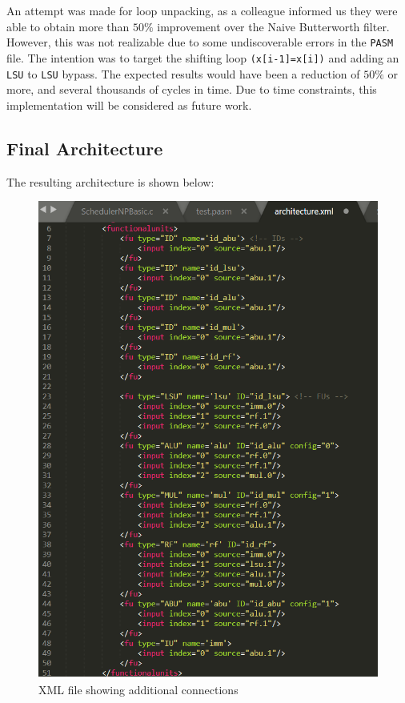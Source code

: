 \documentclass[letterpaper, 10 pt, conference]{ieeeconf}  %
\begin{document}
An attempt was made for loop unpacking, as a colleague informed us they were able to obtain more than $50\%$ improvement over the Naive Butterworth filter. However, this was not realizable due to some undiscoverable errors in the \texttt{PASM} file. The intention was to target the shifting loop \texttt{(x[i-1]=x[i])} and adding an \texttt{LSU} to \texttt{LSU} bypass. The expected results would have been a reduction of $50\%$ or more, and several thousands of cycles in time. Due to time constraints, this implementation will be considered as future work.  

\subsection{Final Architecture}
\label{imp:E}

The resulting architecture is shown below:

\begin{figure}[h!]
\begin{center}
\includegraphics[scale=0.35]{images/arch01.png}
\caption{XML file showing additional connections}
\label{fig:TODO1}
\end{center}
\end{figure}
\end{document}
